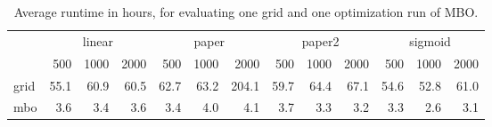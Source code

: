 \begin{table}

\caption{\label{tab:table_time}Average runtime in hours, for evaluating one grid and one optimization run of MBO.}
\centering
\begin{tabular}[t]{lrrrrrrrrrrrr}
\toprule
\multicolumn{1}{c}{ } & \multicolumn{3}{c}{linear} & \multicolumn{3}{c}{paper} & \multicolumn{3}{c}{paper2} & \multicolumn{3}{c}{sigmoid} \\
\cmidrule(l{3pt}r{3pt}){2-4} \cmidrule(l{3pt}r{3pt}){5-7} \cmidrule(l{3pt}r{3pt}){8-10} \cmidrule(l{3pt}r{3pt}){11-13}
 & 500 & 1000 & 2000 & 500 & 1000 & 2000 & 500 & 1000 & 2000 & 500 & 1000 & 2000\\
\midrule
grid & 55.1 & 60.9 & 60.5 & 62.7 & 63.2 & 204.1 & 59.7 & 64.4 & 67.1 & 54.6 & 52.8 & 61.0\\
mbo & 3.6 & 3.4 & 3.6 & 3.4 & 4.0 & 4.1 & 3.7 & 3.3 & 3.2 & 3.3 & 2.6 & 3.1\\
\bottomrule
\end{tabular}
\end{table}
